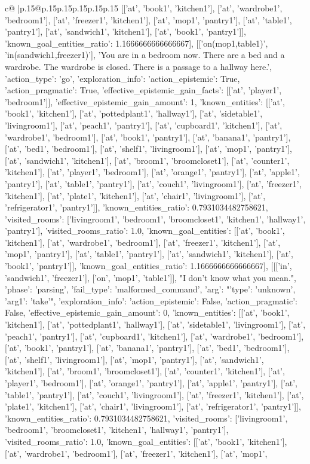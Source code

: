 \documentclass{article}
\begin{document}
{\begin{supertabular}{c@{$\;$}|p{.15\linewidth}@{}p{.15\linewidth}p{.15\linewidth}p{.15\linewidth}p{.15\linewidth}p{.15\linewidth}}
{{{[['at', 'book1', 'kitchen1'], ['at', 'wardrobe1', 'bedroom1'], ['at', 'freezer1', 'kitchen1'], ['at', 'mop1', 'pantry1'], ['at', 'table1', 'pantry1'], ['at', 'sandwich1', 'kitchen1'], ['at', 'book1', 'pantry1']], 'known_goal_entities_ratio': 1.1666666666666667}}], [['on(mop1,table1)', 'in(sandwich1,freezer1)'], 'You are in a bedroom now. There are a bed and a wardrobe. The wardrobe is closed. There is a passage to a hallway here.', {'action_type': 'go', 'exploration_info': {'action_epistemic': True, 'action_pragmatic': True, 'effective_epistemic_gain_facts': [['at', 'player1', 'bedroom1']], 'effective_epistemic_gain_amount': 1, 'known_entities': [['at', 'book1', 'kitchen1'], ['at', 'pottedplant1', 'hallway1'], ['at', 'sidetable1', 'livingroom1'], ['at', 'peach1', 'pantry1'], ['at', 'cupboard1', 'kitchen1'], ['at', 'wardrobe1', 'bedroom1'], ['at', 'book1', 'pantry1'], ['at', 'banana1', 'pantry1'], ['at', 'bed1', 'bedroom1'], ['at', 'shelf1', 'livingroom1'], ['at', 'mop1', 'pantry1'], ['at', 'sandwich1', 'kitchen1'], ['at', 'broom1', 'broomcloset1'], ['at', 'counter1', 'kitchen1'], ['at', 'player1', 'bedroom1'], ['at', 'orange1', 'pantry1'], ['at', 'apple1', 'pantry1'], ['at', 'table1', 'pantry1'], ['at', 'couch1', 'livingroom1'], ['at', 'freezer1', 'kitchen1'], ['at', 'plate1', 'kitchen1'], ['at', 'chair1', 'livingroom1'], ['at', 'refrigerator1', 'pantry1']], 'known_entities_ratio': 0.7931034482758621, 'visited_rooms': ['livingroom1', 'bedroom1', 'broomcloset1', 'kitchen1', 'hallway1', 'pantry1'], 'visited_rooms_ratio': 1.0, 'known_goal_entities': [['at', 'book1', 'kitchen1'], ['at', 'wardrobe1', 'bedroom1'], ['at', 'freezer1', 'kitchen1'], ['at', 'mop1', 'pantry1'], ['at', 'table1', 'pantry1'], ['at', 'sandwich1', 'kitchen1'], ['at', 'book1', 'pantry1']], 'known_goal_entities_ratio': 1.1666666666666667}}], [[['in', 'sandwich1', 'freezer1'], ['on', 'mop1', 'table1']], "I don't know what you mean.", {'phase': 'parsing', 'fail_type': 'malformed_command', 'arg': "{'type': 'unknown', 'arg1': 'take'}", 'exploration_info': {'action_epistemic': False, 'action_pragmatic': False, 'effective_epistemic_gain_amount': 0, 'known_entities': [['at', 'book1', 'kitchen1'], ['at', 'pottedplant1', 'hallway1'], ['at', 'sidetable1', 'livingroom1'], ['at', 'peach1', 'pantry1'], ['at', 'cupboard1', 'kitchen1'], ['at', 'wardrobe1', 'bedroom1'], ['at', 'book1', 'pantry1'], ['at', 'banana1', 'pantry1'], ['at', 'bed1', 'bedroom1'], ['at', 'shelf1', 'livingroom1'], ['at', 'mop1', 'pantry1'], ['at', 'sandwich1', 'kitchen1'], ['at', 'broom1', 'broomcloset1'], ['at', 'counter1', 'kitchen1'], ['at', 'player1', 'bedroom1'], ['at', 'orange1', 'pantry1'], ['at', 'apple1', 'pantry1'], ['at', 'table1', 'pantry1'], ['at', 'couch1', 'livingroom1'], ['at', 'freezer1', 'kitchen1'], ['at', 'plate1', 'kitchen1'], ['at', 'chair1', 'livingroom1'], ['at', 'refrigerator1', 'pantry1']], 'known_entities_ratio': 0.7931034482758621, 'visited_rooms': ['livingroom1', 'bedroom1', 'broomcloset1', 'kitchen1', 'hallway1', 'pantry1'], 'visited_rooms_ratio': 1.0, 'known_goal_entities': [['at', 'book1', 'kitchen1'], ['at', 'wardrobe1', 'bedroom1'], ['at', 'freezer1', 'kitchen1'], ['at', 'mop1', }}}
\end{supertabular}}
\end{document}
